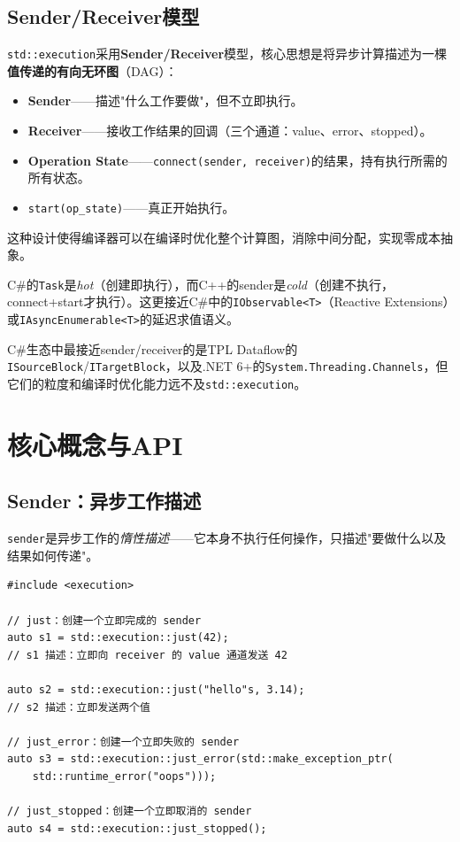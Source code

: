 \documentclass[12pt,a4paper,fontset=fandol]{ctexbook}
\newcommand{\cpp}[1]{C++#1}
\newcommand{\csharp}{C\#}
\begin{document}
\section{Sender/Receiver模型}

\texttt{std::execution}采用\textbf{Sender/Receiver}模型，核心思想是将异步计算描述为一棵\textbf{值传递的有向无环图}（DAG）：

\begin{itemize}[nosep]
\item \textbf{Sender}——描述"什么工作要做"，但不立即执行。
\item \textbf{Receiver}——接收工作结果的回调（三个通道：value、error、stopped）。
\item \textbf{Operation State}——\texttt{connect(sender, receiver)}的结果，持有执行所需的所有状态。
\item \texttt{start(op\_state)}——真正开始执行。
\end{itemize}

这种设计使得编译器可以在编译时优化整个计算图，消除中间分配，实现零成本抽象。

\begin{compare}
\csharp{}的\texttt{Task}是\emph{hot}（创建即执行），而\cpp{}的sender是\emph{cold}（创建不执行，connect+start才执行）。这更接近\csharp{}中的\texttt{IObservable<T>}（Reactive Extensions）或\texttt{IAsyncEnumerable<T>}的延迟求值语义。

\csharp{}生态中最接近sender/receiver的是TPL Dataflow的\texttt{ISource\allowbreak{}Block}/\allowbreak{}\texttt{ITarget\allowbreak{}Block}，以及.NET 6+的\texttt{System.Threading.Channels}，但它们的粒度和编译时优化能力远不及\texttt{std::execution}。
\end{compare}

\chapter{核心概念与API}

\section{Sender：异步工作描述}

\texttt{sender}是异步工作的\emph{惰性描述}——它本身不执行任何操作，只描述"要做什么以及结果如何传递"。

\begin{lstlisting}
#include <execution>

// just：创建一个立即完成的 sender
auto s1 = std::execution::just(42);
// s1 描述：立即向 receiver 的 value 通道发送 42

auto s2 = std::execution::just("hello"s, 3.14);
// s2 描述：立即发送两个值

// just_error：创建一个立即失败的 sender
auto s3 = std::execution::just_error(std::make_exception_ptr(
    std::runtime_error("oops")));

// just_stopped：创建一个立即取消的 sender
auto s4 = std::execution::just_stopped();
\end{lstlisting}
\end{document}
